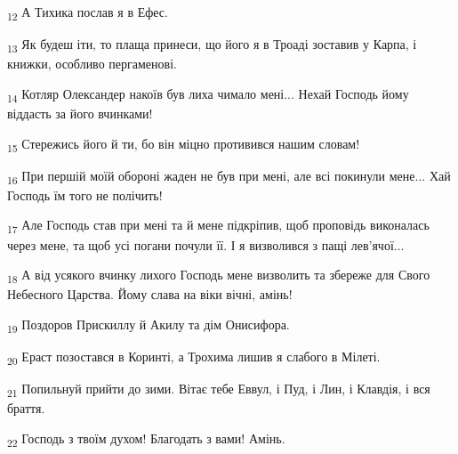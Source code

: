 \begin{tcolorbox}
\textsubscript{12} А Тихика послав я в Ефес.
\end{tcolorbox}
\begin{tcolorbox}
\textsubscript{13} Як будеш іти, то плаща принеси, що його я в Троаді зоставив у Карпа, і книжки, особливо пергаменові.
\end{tcolorbox}
\begin{tcolorbox}
\textsubscript{14} Котляр Олександер накоїв був лиха чимало мені... Нехай Господь йому віддасть за його вчинками!
\end{tcolorbox}
\begin{tcolorbox}
\textsubscript{15} Стережись його й ти, бо він міцно противився нашим словам!
\end{tcolorbox}
\begin{tcolorbox}
\textsubscript{16} При першій моїй обороні жаден не був при мені, але всі покинули мене... Хай Господь їм того не полічить!
\end{tcolorbox}
\begin{tcolorbox}
\textsubscript{17} Але Господь став при мені та й мене підкріпив, щоб проповідь виконалась через мене, та щоб усі погани почули її. І я визволився з пащі лев'ячої...
\end{tcolorbox}
\begin{tcolorbox}
\textsubscript{18} А від усякого вчинку лихого Господь мене визволить та збереже для Свого Небесного Царства. Йому слава на віки вічні, амінь!
\end{tcolorbox}
\begin{tcolorbox}
\textsubscript{19} Поздоров Прискиллу й Акилу та дім Онисифора.
\end{tcolorbox}
\begin{tcolorbox}
\textsubscript{20} Ераст позостався в Коринті, а Трохима лишив я слабого в Мілеті.
\end{tcolorbox}
\begin{tcolorbox}
\textsubscript{21} Попильнуй прийти до зими. Вітає тебе Еввул, і Пуд, і Лин, і Клавдія, і вся браття.
\end{tcolorbox}
\begin{tcolorbox}
\textsubscript{22} Господь з твоїм духом! Благодать з вами! Амінь.
\end{tcolorbox}
